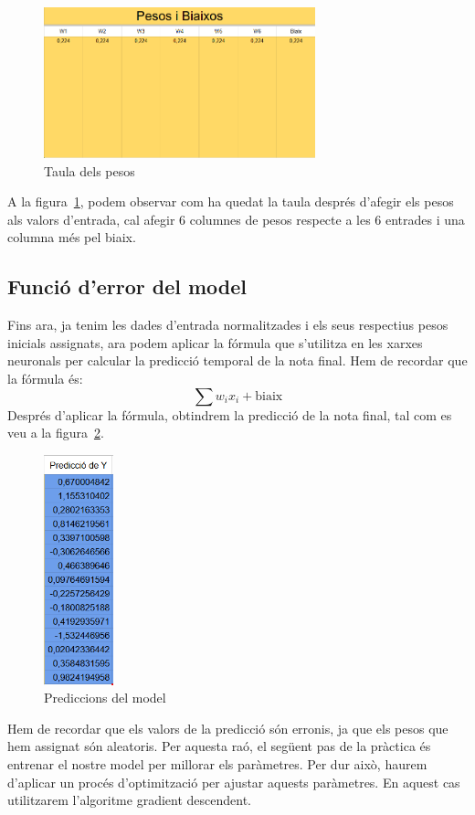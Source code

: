 \begin{figure}[h!]
    \centering
    \includegraphics[width=0.7\textwidth]{./figures/Pesos.png}
    \caption{Taula dels pesos}
    \label{f:pesos}
\end{figure}

A la figura~\ref{f:pesos}, podem observar com ha quedat la taula després d'afegir els pesos als valors d'entrada, cal afegir 6 columnes de pesos respecte a les 6 entrades i una columna més pel biaix.

\subsection{Funció d'error del model}
Fins ara, ja tenim les dades d'entrada normalitzades i els seus respectius pesos inicials assignats, ara podem aplicar la fórmula que s'utilitza en les xarxes neuronals per calcular la predicció temporal de la nota final. Hem de recordar que la fórmula és:
$$\sum w_i x_i + \text{biaix}$$
Després d'aplicar la fórmula, obtindrem la predicció de la nota final, tal com es veu a la figura~\ref{f:Predicciones}.
\begin{figure}[h!]
    \centering
    \includegraphics[width=0.18\textwidth]{./figures/Predicciones.png}
    \caption{Prediccions del model}
    \label{f:Predicciones}
 \end{figure}
Hem de recordar que els valors de la predicció són erronis, ja que els pesos que hem assignat són aleatoris. Per aquesta raó, el següent pas de la pràctica és entrenar el nostre model per millorar els paràmetres. Per dur això, haurem d'aplicar un procés d'optimització per ajustar aquests paràmetres. En aquest cas utilitzarem l'algoritme gradient descendent.

